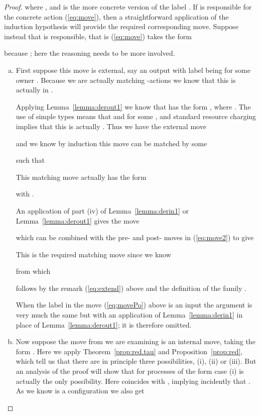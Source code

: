 \documentclass{LMCS}
\begin{document}
\begin{proof}
where , and   is the more
concrete version of the label .
If  is responsible for the concrete action (\ref{eq:move}), 
then a straightforward application of the induction hypothesis
will provide the required corresponding move. Suppose instead that  is
responsible, that is (\ref{eq:move}) takes the form

because ; here the reasoning
needs to be more involved. 
\begin{enumerate}[(a)]
\item First suppose this move is external, say an output with label
   being
   for some owner . 
Because we are actually matching -actions we know that this  is actually in . 

 Applying 
  Lemma~\ref{lemma:derout1} we know that  has the form
  , where .
The use of simple types means that  and  for some
, and standard resource charging implies that this  is actually . Thus we have
the external move

and  we know 
by induction  this move can be matched by some 

such that

This matching move actually has the form

with . 

An application of part (iv) of Lemma~\ref{lemma:derin1} or Lemma~\ref{lemma:derout1} gives the move

which can be combined with the pre- and post-  moves in (\ref{eq:move2}) to give

This is the required matching move since we know 

from which

follows by the remark (\ref{eq:extend}) above and the definition of the family .

When the label  in the move (\ref{eq:movePo}) above is an input the argument is very  much the same but
with an application of 
Lemma~\ref{lemma:derin1} in place of Lemma~\ref{lemma:derout1}; it is therefore omitted. 

\item



Now suppose the move from  we are examining is an internal move, taking the form
. Here we apply Theorem~\ref{prop:red.tau} and 
Proposition~\ref{prop:red}, which tell us that there are in principle three 
possibilities, (i), (ii)  or (iii). But an analysis of the proof will show that for processes of the form
 case (i) is actually the only possibility. 
Here   coincides with , implying  incidently that
. As we know  is a configuration we also get


\end{enumerate}
\end{proof}
\end{document}

